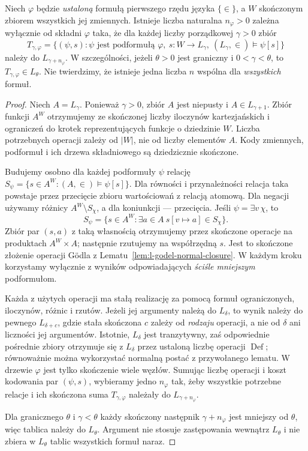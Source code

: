 \begin{lemat}
\label{lem:l-local-satisfaction-bound-76}
Niech $\varphi$ będzie \emph{ustaloną} formułą pierwszego
rzędu języka $\{\in\}$, a $W$ skończonym zbiorem
wszystkich jej zmiennych. Istnieje liczba naturalna
$n_\varphi>0$ zależna wyłącznie od składni $\varphi$
taka, że dla każdej liczby porządkowej $\gamma>0$
zbiór
\[
T_{\gamma,\varphi}=\bigl\{(\psi,s):
  \psi\text{ jest podformułą }\varphi,\ 
  s:W\to L_\gamma,\ (L_\gamma,\in)\models\psi[s]\bigr\}
\]
należy do $L_{\gamma+n_\varphi}$.
W szczególności, jeżeli $\theta>0$ jest graniczny
i $0<\gamma<\theta$, to $T_{\gamma,\varphi}\in L_\theta$.
Nie twierdzimy, że istnieje jedna liczba $n$
wspólna dla \emph{wszystkich} formuł.
\end{lemat}
\begin{proof}
Niech $A=L_\gamma$. Ponieważ $\gamma>0$, zbiór
$A$ jest niepusty i $A\in L_{\gamma+1}$.
Zbiór funkcji $A^W$ otrzymujemy ze skończonej
liczby iloczynów kartezjańskich i ograniczeń do
krotek reprezentujących funkcje o dziedzinie $W$.
Liczba potrzebnych operacji zależy od $|W|$, nie
od liczby elementów $A$. Kody zmiennych, podformuł
i ich drzewa składniowego są dziedzicznie skończone.

Budujemy osobno dla każdej podformuły $\psi$ relację
$S_\psi=\{s\in A^W:(A,\in)\models\psi[s]\}$.
Dla równości i przynależności relacja taka powstaje
przez przecięcie zbioru wartościowań z relacją
atomową. Dla negacji używamy różnicy
$A^W\setminus S_\chi$, a dla koniunkcji — przecięcia.
Jeśli $\psi=\exists v\,\chi$, to
\[
S_\psi=\{s\in A^W:\exists a\in A\ 
                   s[v\mapsto a]\in S_\chi\}.
\]
Zbiór par $(s,a)$ z taką własnością otrzymujemy
przez skończone operacje na produktach $A^W\times A$;
następnie rzutujemy na współrzędną $s$. Jest to
skończone złożenie operacji Gödla z
Lematu~\ref{lem:l-godel-normal-closure}.
W każdym kroku korzystamy wyłącznie z wyników
odpowiadających \emph{ściśle mniejszym} podformułom.

Każda z użytych operacji ma stałą realizację za pomocą
formuł ograniczonych, iloczynów, różnic i rzutów.
Jeżeli jej argumenty należą do $L_\delta$, to wynik
należy do pewnego $L_{\delta+c}$, gdzie stała skończona
$c$ zależy od \emph{rodzaju} operacji, a nie od
$\delta$ ani liczności jej argumentów. Istotnie,
$L_\delta$ jest tranzytywny, zaś odpowiednie pośrednie
zbiory otrzymuje się z $L_\delta$ przez ustaloną liczbę
operacji $\operatorname{Def}$; równoważnie można
wykorzystać normalną postać z przywołanego lematu.
W drzewie $\varphi$ jest tylko skończenie wiele węzłów.
Sumując liczbę operacji i koszt kodowania par
$(\psi,s)$, wybieramy jedno $n_\varphi$ tak, żeby
wszystkie potrzebne relacje i ich skończona suma
$T_{\gamma,\varphi}$ należały do $L_{\gamma+n_\varphi}$.

Dla granicznego $\theta$ i $\gamma<\theta$ każdy
skończony następnik $\gamma+n_\varphi$ jest
mniejszy od $\theta$, więc tablica należy do
$L_\theta$. Argument nie stosuje zastępowania
wewnątrz $L_\theta$ i nie zbiera w $L_\theta$
tablic wszystkich formuł naraz.
\end{proof}

